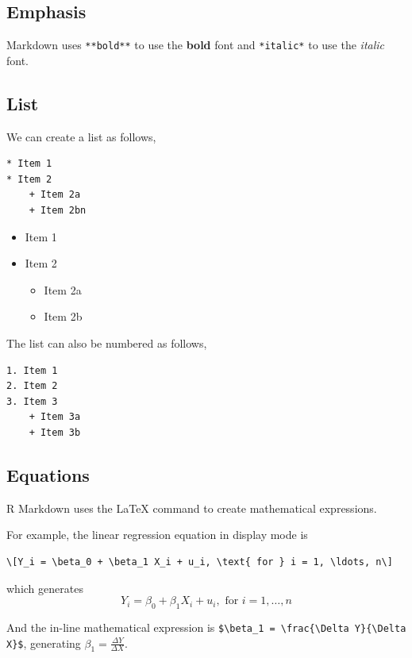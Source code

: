 \documentclass[11pt]{article}
\begin{document}
\subsection*{Emphasis}
\label{sec:org7ce6ded}

Markdown uses \texttt{**bold**} to use the \textbf{bold} font and \texttt{*italic*} to use
the \emph{italic} font.

\subsection*{List}
\label{sec:orga2dc8ac}

We can create a list as follows,

\begin{verbatim}
* Item 1
* Item 2
    + Item 2a
    + Item 2bn
\end{verbatim}

\begin{itemize}
\item Item 1
\item Item 2

\begin{itemize}
\item Item 2a
\item Item 2b
\end{itemize}
\end{itemize}

The list can also be numbered as follows,

\begin{verbatim}
1. Item 1
2. Item 2
3. Item 3
    + Item 3a
    + Item 3b
\end{verbatim}

\subsection*{Equations}
\label{sec:orgcda8c15}

R Markdown uses the \LaTeX{} command to create mathematical expressions.

For example, the linear regression equation in display mode is

\begin{verbatim}
\[Y_i = \beta_0 + \beta_1 X_i + u_i, \text{ for } i = 1, \ldots, n\]
\end{verbatim}

which generates
$$Y_i = \beta_0 + \beta_1 X_i + u_i, \text{ for } i = 1, \ldots, n$$

And the in-line mathematical expression is
\texttt{\$\textbackslash{}beta\_1 = \textbackslash{}frac\{\textbackslash{}Delta Y\}\{\textbackslash{}Delta X\}\$}, generating
\(\beta_1 = \frac{\Delta Y}{\Delta X}\).
\end{document}

